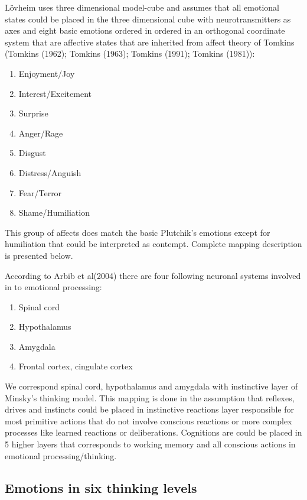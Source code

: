 Lövheim uses three dimensional model-cube and assumes that all emotional states could be placed in the three dimensional cube with neurotransmitters as axes and eight basic emotions ordered in ordered in an orthogonal coordinate system that are affective states that are inherited from affect theory of Tomkins (Tomkins (1962); Tomkins (1963); Tomkins (1991); Tomkins (1981)):

\begin{enumerate}
\item  Enjoyment/Joy
\item  Interest/Excitement
\item  Surprise
\item  Anger/Rage
\item  Disgust
\item  Distress/Anguish
\item  Fear/Terror
\item  Shame/Humiliation
\end{enumerate}

This group of affects does match the basic Plutchik's emotions except for humiliation that could be interpreted as contempt. Complete mapping description is presented below.

According to Arbib et al(2004) there are four following neuronal systems involved in to emotional processing:

\begin{enumerate}
\item  Spinal cord
\item  Hypothalamus
\item  Amygdala
\item  Frontal cortex, cingulate cortex
\end{enumerate}

We correspond spinal cord, hypothalamus and amygdala with instinctive layer of Minsky's thinking model. This mapping is done in the assumption that reflexes, drives and instincts could be placed in instinctive reactions layer responsible for most primitive actions that do not involve conscious reactions or more complex processes like learned reactions or deliberations. Cognitions are could be placed in 5 higher layers that corresponds to working memory and all conscious actions in emotional processing/thinking.

\subsection{Emotions in six thinking levels}

